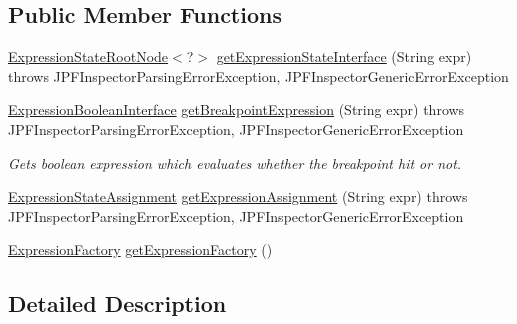 \subsection*{Public Member Functions}
\begin{DoxyCompactItemize}
\item 
\hyperlink{interfacegov_1_1nasa_1_1jpf_1_1inspector_1_1server_1_1expression_1_1_expression_state_root_node}{Expression\+State\+Root\+Node}$<$?$>$ \hyperlink{interfacegov_1_1nasa_1_1jpf_1_1inspector_1_1server_1_1expression_1_1_expression_parser_interface_adf1e661201d1a5686257122c604fc897}{get\+Expression\+State\+Interface} (String expr)  throws J\+P\+F\+Inspector\+Parsing\+Error\+Exception, J\+P\+F\+Inspector\+Generic\+Error\+Exception
\item 
\hyperlink{interfacegov_1_1nasa_1_1jpf_1_1inspector_1_1server_1_1expression_1_1_expression_boolean_interface}{Expression\+Boolean\+Interface} \hyperlink{interfacegov_1_1nasa_1_1jpf_1_1inspector_1_1server_1_1expression_1_1_expression_parser_interface_acf4ebfde0a03c8eb9c52b84cd7757abd}{get\+Breakpoint\+Expression} (String expr)  throws J\+P\+F\+Inspector\+Parsing\+Error\+Exception, J\+P\+F\+Inspector\+Generic\+Error\+Exception
\begin{DoxyCompactList}\small\item\em Gets boolean expression which evaluates whether the breakpoint hit or not. \end{DoxyCompactList}\item 
\hyperlink{classgov_1_1nasa_1_1jpf_1_1inspector_1_1server_1_1expression_1_1expressions_1_1_expression_state_assignment}{Expression\+State\+Assignment} \hyperlink{interfacegov_1_1nasa_1_1jpf_1_1inspector_1_1server_1_1expression_1_1_expression_parser_interface_abe7eab3b20d74ab697ca3cbefbc5c736}{get\+Expression\+Assignment} (String expr)  throws J\+P\+F\+Inspector\+Parsing\+Error\+Exception, J\+P\+F\+Inspector\+Generic\+Error\+Exception
\item 
\hyperlink{classgov_1_1nasa_1_1jpf_1_1inspector_1_1server_1_1expression_1_1_expression_factory}{Expression\+Factory} \hyperlink{interfacegov_1_1nasa_1_1jpf_1_1inspector_1_1server_1_1expression_1_1_expression_parser_interface_aaac5fee1c824dbc141489b89318d5578}{get\+Expression\+Factory} ()
\end{DoxyCompactItemize}


\subsection{Detailed Description}



